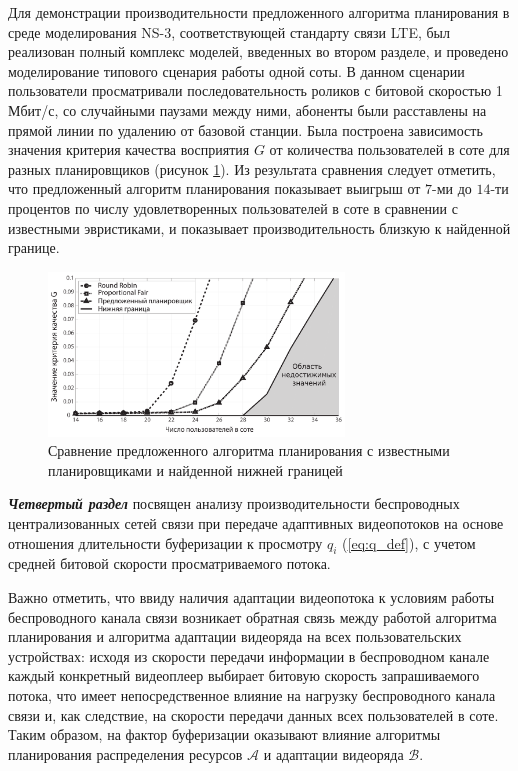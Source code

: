 Для демонстрации производительности предложенного алгоритма планирования в среде моделирования NS-3, соответствующей стандарту связи LTE, был реализован полный комплекс моделей, введенных во втором разделе, и проведено моделирование типового сценария работы одной соты. В данном сценарии пользователи просматривали последовательность роликов с битовой скоростью 1 Мбит/с, со случайными паузами между ними, абоненты были расставлены на прямой линии по удалению от базовой станции. Была построена зависимость значения критерия качества  восприятия $G$ от количества пользователей в соте для разных планировщиков (рисунок \ref{fig:G_PLOT}). Из результата сравнения следует отметить, что предложенный алгоритм планирования показывает выигрыш от $7$-ми до $14$-ти процентов по числу удовлетворенных пользователей в соте в сравнении с известными эвристиками, и показывает производительность близкую к найденной границе.
\begin{figure}[htbp]
\begin{center}
\includegraphics[width=0.7\textwidth]{../Dissertation/images//Chapter3/G_PLOT.pdf}
\caption{Сравнение предложенного алгоритма планирования с известными планировщиками и найденной нижней границей}
\label{fig:G_PLOT}
\end{center}
\end{figure}

\textbf{\textit{Четвертый раздел}} посвящен анализу производительности беспроводных централизованных сетей связи при передаче адаптивных видеопотоков на основе отношения длительности буферизации к просмотру $q_i$ (\ref{eq:q_def}), с учетом средней битовой скорости просматриваемого потока.

Важно отметить, что ввиду наличия адаптации видеопотока к условиям работы беспроводного канала связи возникает обратная связь между работой алгоритма планирования и алгоритма адаптации видеоряда на всех пользовательских устройствах: исходя из скорости передачи информации в беспроводном канале каждый конкретный видеоплеер выбирает битовую скорость запрашиваемого потока, что имеет непосредственное влияние на нагрузку беспроводного канала связи и, как следствие, на скорости передачи данных всех пользователей в соте. Таким образом, на фактор буферизации оказывают влияние алгоритмы планирования распределения ресурсов $\mathcal{A}$ и адаптации видеоряда $\mathcal{B}$.

